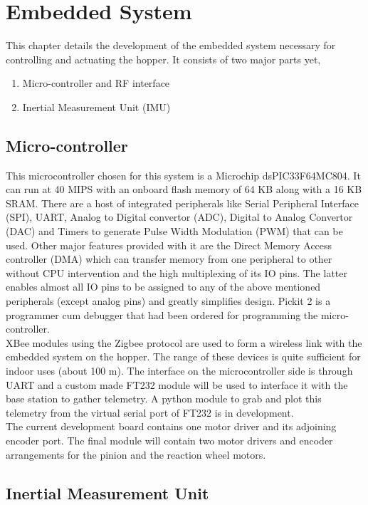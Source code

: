 \chapter{Embedded System}
\label{chap:embedded}
This chapter details the development of the embedded system necessary for controlling and actuating the hopper. It consists of two
major parts yet,
\begin{enumerate}
\item
Micro-controller and RF interface
\item
Inertial Measurement Unit (IMU)
\end{enumerate}

\section{Micro-controller}
This microcontroller chosen for this system is a Microchip dsPIC33F64MC804. It can run at 40 MIPS with an onboard flash memory of
64 KB along with a 16 KB SRAM. There are a host of integrated peripherals like Serial Peripheral Interface (SPI), UART, Analog to
Digital convertor (ADC), Digital to Analog Convertor (DAC) and Timers to generate Pulse Width Modulation (PWM) that can be used.
Other major features provided with it are the Direct Memory Access controller (DMA) which can transfer memory from one peripheral
to other without CPU intervention and the high multiplexing of its IO pins. The latter enables almost all IO pins to be assigned
to any of the above mentioned peripherals (except analog pins) and greatly simplifies design. Pickit 2 is a programmer cum
debugger that had been ordered for programming the micro-controller.\\

XBee modules using the Zigbee protocol are used to form a wireless link with the embedded system on the hopper. The range of these
devices is quite sufficient for indoor uses (about 100 m). The interface on the microcontroller side is through UART and a custom
made FT232 module will be used to interface it with the base station to gather telemetry. A python module to grab and plot this 
telemetry from the virtual serial port of FT232 is in development.\\

The current development board contains one motor driver and its adjoining encoder port. The final module will contain two motor
drivers and encoder arrangements for the pinion and the reaction wheel motors.

\section{Inertial Measurement Unit}

